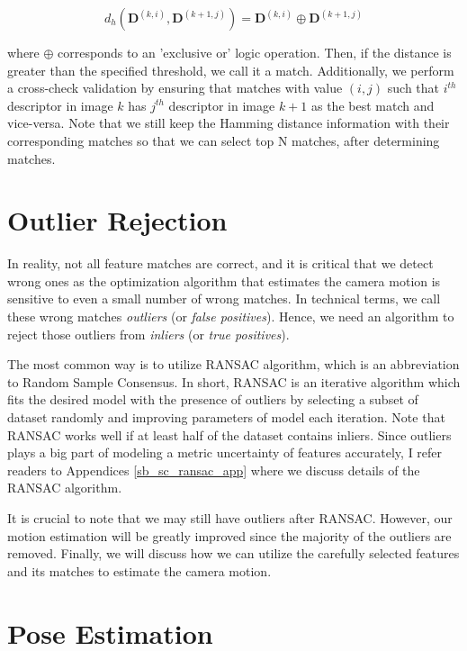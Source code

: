 \documentclass[12pt]{report}
\numberwithin{figure}{section}
\begin{document}
\begin{equation}
  d_h(\mathbf{D}^{(k,i)},\mathbf{D}^{(k+1,j)}) = \mathbf{D}^{(k,i)} \oplus 
  \mathbf{D}^{(k+1, j)}
\end{equation}

where $\oplus$ corresponds to an 'exclusive or' logic operation. Then, if the 
distance is greater than the specified threshold, we call it a match. 
Additionally, we perform a cross-check validation by ensuring that matches 
with value $(i,j)$ such that $i^{th}$ descriptor in image $k$ has $j^{th}$ 
descriptor in image $k+1$ as the best match and vice-versa.
Note that we still keep the Hamming distance information with their 
corresponding matches so that we can select top N matches, after 
determining matches.


\section{Outlier Rejection} \label{sb_sc_ransac}

In reality, not all feature matches are correct, and it is critical that we 
detect wrong ones as the optimization algorithm that estimates the camera 
motion is sensitive to even a small number of wrong matches. In technical 
terms, we call these wrong matches \textit{outliers} (or \textit{false 
positives}). Hence, we need an algorithm to reject those outliers from 
\textit{inliers} (or \textit{true positives}). 

The most common way is to utilize 
RANSAC 
\parencite{Fischler1981b} algorithm, 
which is an abbreviation to Random Sample Consensus. In short, RANSAC is an 
iterative 
algorithm which fits the desired model with the presence of outliers by 
selecting a subset of dataset randomly and improving parameters of model each 
iteration. Note that RANSAC works well if at least half of the dataset 
contains inliers. Since outliers plays a big part of modeling a metric 
uncertainty of features accurately, I refer readers to Appendices 
\ref{sb_sc_ransac_app} 
where we discuss details of the RANSAC algorithm. 


It is crucial to note that we may still have outliers after RANSAC.  However, 
our motion estimation will be greatly improved since the majority of the 
outliers are removed.  Finally, we will discuss how we can utilize the 
carefully selected features and its matches to estimate the camera motion. 


\section{Pose Estimation} \label{sc_pose_estimation}
\end{document}
